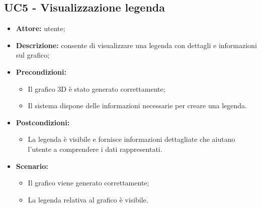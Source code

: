 \subsection{UC5 - Visualizzazione legenda}
\begin{itemize}
    \item \textbf{Attore:} utente;
    \item \textbf{Descrizione:} consente di visualizzare una legenda con dettagli e informazioni sul grafico;
    \item \textbf{Precondizioni:} 
    \begin{itemize}
        \item Il grafico 3D è stato generato correttamente;
        \item Il sistema dispone delle informazioni necessarie per creare una legenda.
    \end{itemize}
    \item \textbf{Postcondizioni:}
    \begin{itemize}
        \item La legenda è visibile e fornisce informazioni dettagliate che aiutano l'utente a comprendere i dati rappresentati.
    \end{itemize}
    \item \textbf{Scenario:} 
    \begin{itemize}
        \item Il grafico viene generato correttamente;
        \item La legenda relativa al grafico è visibile.
    \end{itemize}
\end{itemize}
